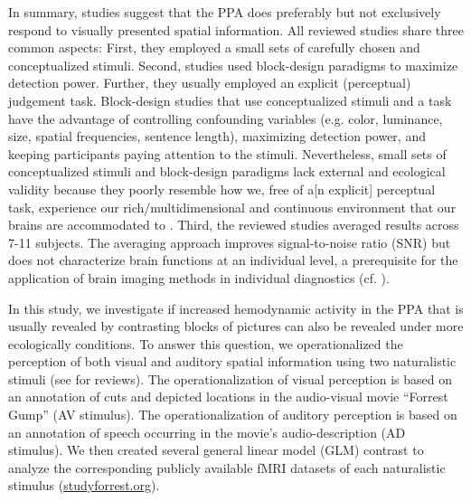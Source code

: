 \documentclass[english]{article}
\begin{document}
In summary, studies suggest that the PPA does preferably but not exclusively
respond to visually presented spatial information.
All reviewed studies share three common aspects:
First, they employed a small sets of carefully chosen and conceptualized
stimuli.
Second, studies used block-design paradigms to maximize detection power.
Further, they usually employed an explicit (perceptual) judgement task.
Block-design studies that use conceptualized stimuli and a task have the
advantage of controlling confounding variables (e.g. color, luminance, size,
spatial frequencies, sentence length), maximizing detection power, and keeping
participants paying attention to the stimuli.
Nevertheless, small sets of conceptualized stimuli and block-design paradigms
lack external and ecological validity \citep{westfall2016fixing,
hasson2004intersubject} because they poorly resemble how we, free of a[n
explicit] perceptual task, experience our rich/multidimensional and continuous
environment that our brains are accommodated to
\citep{sonkusare2019naturalistic}.
Third, the reviewed studies averaged results across 7-11 subjects.
The averaging approach improves signal-to-noise ratio (SNR) but does not
characterize brain functions at an individual level, a prerequisite for the
application of brain imaging methods in individual diagnostics (cf.
\cite{dubois2016building, eickhoff2020towards}).

In this study, we investigate if increased hemodynamic activity in the PPA that
is usually revealed by contrasting blocks of pictures can also be revealed under
more ecologically conditions.
To answer this question, we operationalized the perception of both visual and
auditory spatial information using two naturalistic stimuli (see
\citep{hamilton2018revolution, hasson2008neurocinematics,
sonkusare2019naturalistic} for reviews).
The operationalization of visual perception is based on an annotation of cuts
and depicted locations in the audio-visual movie ``Forrest Gump'' (AV stimulus).
The operationalization of auditory perception is based on an annotation of
speech occurring in the movie's audio-description (AD stimulus).
We then created several general linear model (GLM) contrast to analyze the
corresponding publicly available fMRI datasets of each naturalistic stimulus
\citep{hanke2016simultaneous, hanke2014audiomovie}
(\href{http://www.studyforrest.org}{studyforrest.org}).
\end{document}

